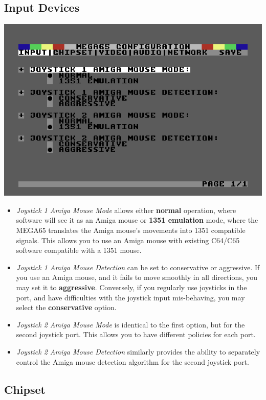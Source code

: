\subsection{Input Devices}

\includegraphics[width=\linewidth]{images/ss-m65config-1.png}

\begin{itemize}
  \item{\em Joystick 1 Amiga Mouse Mode} allows either {\bf normal} operation,
  where software will see it as an Amiga mouse or {\bf 1351 emulation} mode, where the MEGA65 translates the Amiga mouse's movements into 1351 compatible  signals. This allows you to use an Amiga mouse with existing C64/C65 software compatible with a 1351 mouse.
  \item{\em Joystick 1 Amiga Mouse Detection} can be set to conservative or aggressive. If you use an Amiga mouse, and it fails to move smoothly in all directions, you may set it to {\bf aggressive}. Conversely, if you regularly use joysticks in the port, and have difficulties with the joystick input mis-behaving, you may select the {\bf conservative} option.
  \item{\em Joystick 2 Amiga Mouse Mode} is identical to the first option, but for the second joystick port. This allows you to have different policies for each port.
  \item{\em Joystick 2 Amiga Mouse Detection} similarly provides the ability to separately control the Amiga mouse detection algorithm for the second joystick port.
\end{itemize}


\subsection{Chipset}


